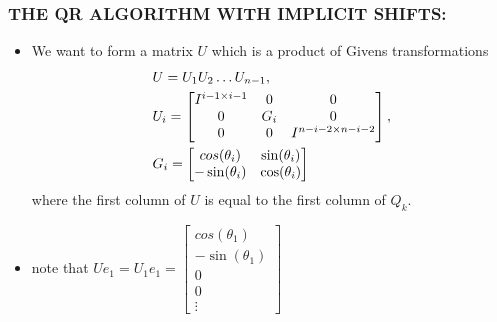 \documentclass[a4paper,8pt]{beamer} %
\newcommand{\smatrix}[1]{\left[\begin{matrix} #1 \end{matrix}\right]}
\begin{document}
\begin{frame} %
\frametitle{THE QR ALGORITHM WITH IMPLICIT SHIFTS:} 
	\begin{itemize}
		\item
		We want to form a matrix $U$ which is a product of Givens transformations
		\begin{align}
			&U = U_{1}U_{2}\dots U_{n-1}, \notag\\ 
			&U_i = 
			\smatrix{ 
				I^{i-1\times i-1} 	& 0 	& 0 \\ 
				0 					& G_i 	& 0 \\ 
				0 					& 0 	& I^{n-i-2\times n-i-2}}, \notag\\
				&G_i = \smatrix{cos(\theta_i) & \sin(\theta_i) \\ -\sin(\theta_i) & \cos(\theta_i)}
		\end{align}
		where the first column of $U$ is equal to the first column of $Q_k$.
		\item
		note that $Ue_1 = U_1e_1 = \smatrix{cos(\theta_1)\\ -\sin(\theta_1) \\ 0 \\ 0 \\ \vdots}$
	\end{itemize}
\end{frame}%
\end{document}
